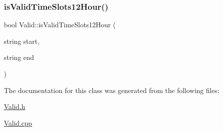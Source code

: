 \subsubsection{\texorpdfstring{is\+Valid\+Time\+Slots12\+Hour()}{isValidTimeSlots12Hour()}}
{\footnotesize\ttfamily bool Valid\+::is\+Valid\+Time\+Slots12\+Hour (\begin{DoxyParamCaption}\item[{string}]{start,  }\item[{string}]{end }\end{DoxyParamCaption})}



The documentation for this class was generated from the following files\+:\begin{DoxyCompactItemize}
\item 
\hyperlink{_valid_8h}{Valid.\+h}\item 
\hyperlink{_valid_8cpp}{Valid.\+cpp}\end{DoxyCompactItemize}
